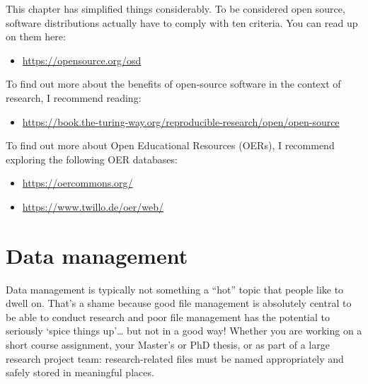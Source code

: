 \documentclass[
  letterpaper,
  DIV=11,
  numbers=noendperiod]{scrreprt}
\providecommand{\tightlist}{%
  \setlength{\itemsep}{0pt}\setlength{\parskip}{0pt}}\usepackage{longtable,booktabs,array}
\begin{document}
\begin{tcolorbox}[enhanced jigsaw, colframe=quarto-callout-note-color-frame, titlerule=0mm, toptitle=1mm, leftrule=.75mm, colbacktitle=quarto-callout-note-color!10!white, title=\textcolor{quarto-callout-note-color}{\faInfo}\hspace{0.5em}{Tips to go further}, bottomtitle=1mm, coltitle=black, breakable, opacitybacktitle=0.6, colback=white, left=2mm, arc=.35mm, opacityback=0, toprule=.15mm, rightrule=.15mm, bottomrule=.15mm]

This chapter has simplified things considerably. To be considered open
source, software distributions actually have to comply with ten
criteria. You can read up on them here:

\begin{itemize}
\tightlist
\item
  \url{https://opensource.org/osd}
\end{itemize}

To find out more about the benefits of open-source software in the
context of research, I recommend reading:

\begin{itemize}
\tightlist
\item
  \url{https://book.the-turing-way.org/reproducible-research/open/open-source}
\end{itemize}

To find out more about Open Educational Resources (OERs), I recommend
exploring the following OER databases:

\begin{itemize}
\tightlist
\item
  \url{https://oercommons.org/}
\item
  \url{https://www.twillo.de/oer/web/}
\end{itemize}

\end{tcolorbox}


\chapter{Data management}\label{data-management}

Data management is typically not something a ``hot'' topic that people
like to dwell on. That's a shame because good file management is
absolutely central to be able to conduct research and poor file
management has the potential to seriously `spice things up'\ldots{} but
not in a good way! Whether you are working on a short course assignment,
your Master's or PhD thesis, or as part of a large research project
team: research-related files must be named appropriately and safely
stored in meaningful places.
\end{document}
